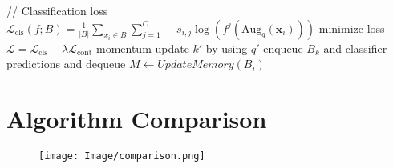 \documentclass{article} %
\begin{document}
\begin{algorithm}[ht!]
\begin{algorithmic}[1]
                \State // Classification loss
                \State $\mathcal{L}_{\text{cls}}(f;B) = \frac{1}{|B|} \sum_{x_i \in B}\sum_{j=1}^C -s_{i, j} \log(f^j(\text{Aug}_q(\boldsymbol{x}_i)))$
                \State minimize loss $\mathcal{L} = \mathcal{L}_{\text{cls}} + \lambda\mathcal{L}_{\text{cont}}$
                \State momentum update $k'$ by using $q'$
                \State enqueue $B_k$ and classifier predictions and dequeue
            \EndFor
            \State $M \leftarrow UpdateMemory(B_i)$
        \EndFor
    \end{algorithmic}
\end{algorithm}

\newpage
\section{Algorithm Comparison}
\begin{figure}[h]
    \begin{center}
    \texttt{[image: Image/comparison.png]}
    \end{center}
\end{figure}
\end{document}
